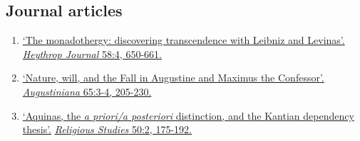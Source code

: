 \subsection{Journal articles}
\begin{enumerate}
	\setcounter{enumi}{\value{publicationCounter}}	%

	\item \datedsubsectionnarrow{}
{}
{
	\href{https://www.academia.edu/14431957/The_monadothergy_discovering_transcendence_with_Leibniz_and_Levinas}{`The monadothergy: discovering transcendence with Leibniz and Levinas'.} \href{https://onlinelibrary.wiley.com/doi/abs/10.1111/heyj.12497}{\emph{Heythrop Journal} 58:4, 650-661.}
}
{}
	\item {}
{}
{
	\href{https://www.academia.edu/19927006/Nature_will_and_the_Fall_in_Augustine_and_Maximus_the_Confessor}{`Nature, will, and the Fall in Augustine and Maximus the Confessor'.} \href{https://poj.peeters-leuven.be/content.php?url=article\&id=3144290\&download=yes}{\emph{Augustiniana} 65:3-4, 205-230.}}
{}
	\item {}
{}
{
	\href{https://www.academia.edu/6326310/Aquinas_the_a_priori_a_posteriori_distinction_and_the_Kantian_dependency_thesis}{`Aquinas, the \emph{a priori/a posteriori} distinction, and the Kantian dependency thesis'.} \href{https://www.cambridge.org/core/journals/religious-studies/article/abs/aquinas-the-a-prioria-posteriori-distinction-and-the-kantian-dependency-thesis/E54AA5D031B1465696DB67ADB84F4812}{\emph{Religious Studies} 50:2, 175-192.}}
{}

	\setcounter{publicationCounter}{\value{enumi}}	%
\end{enumerate}
